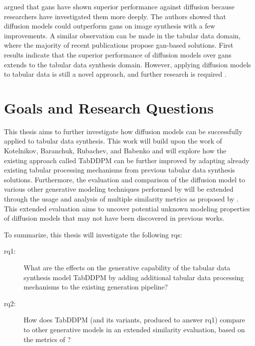 \cite{dhariwal2021DiffusionModelsBeat} argued that \glspl{gan} have shown superior performance against diffusion because researchers have investigated them more deeply.
The authors showed that diffusion models could outperform \glspl{gan} on image synthesis with a few improvements.
A similar observation can be made in the tabular data domain, where the majority of recent publications propose \gls{gan}-based solutions.
First results \cite{kotelnikov2022TabDDPMModellingTabular} indicate that the superior performance of diffusion models over \glspl{gan} extends to the tabular data synthesis domain.
However, applying diffusion models to tabular data is still a novel approach, and further research is required \cite{borisov2022DeepNeuralNetworks}.


\section{Goals and Research Questions}
\label{ch:intro-goals}
This thesis aims to further investigate how diffusion models can be successfully applied to tabular data synthesis.
This work will build upon the work of Kotelnikov, Baranchuk, Rubachev, and Babenko \cite{kotelnikov2022TabDDPMModellingTabular} and will explore how the existing approach called TabDDPM can be further improved by adapting
already existing tabular processing mechanisms from previous tabular data synthesis solutions.
Furthermore, the evaluation and comparison of the diffusion model to various other generative modeling techniques performed by \textcite{kotelnikov2022TabDDPMModellingTabular} will be extended through the usage and analysis
of multiple similarity metrics as proposed by \textcite{chundawat2022UniversalMetricRobust}.
This extended evaluation aims to uncover potential unknown modeling properties of diffusion models that may not have been discovered in previous works.

To summarize, this thesis will investigate the following \glspl{rq}:

\begin{description}
	\item[\gls{rq}1:] What are the effects on the generative capability of the tabular data synthesis model TabDDPM by adding additional tabular data processing mechanisms to the existing generation pipeline?
	\item[\gls{rq}2:] How does TabDDPM (and its variants, produced to answer \gls{rq}1) compare to other generative models in an extended similarity evaluation, based on the metrics of \textcite{chundawat2022UniversalMetricRobust}?
\end{description}

